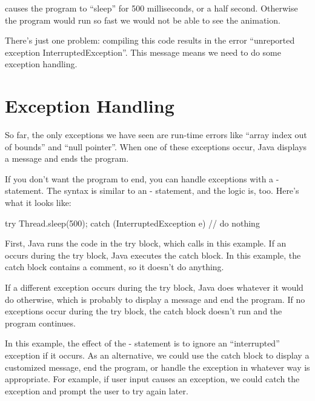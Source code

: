 
 causes the program to ``sleep'' for 500 milliseconds, or a half second.
Otherwise the program would run so fast we would not be able to see the animation.


There's just one problem: compiling this code results in the error ``unreported exception InterruptedException''.
This message means we need to do some exception handling.


\section{Exception Handling}

So far, the only exceptions we have seen are run-time errors like ``array index out of bounds'' and ``null pointer''.
When one of these exceptions occur, Java displays a message and ends the program.

If you don't want the program to end, you can handle exceptions with a - statement.
The syntax is similar to an - statement, and the logic is, too.
Here's what it looks like:


\begin{code}
try {
    Thread.sleep(500);
} catch (InterruptedException e) {
    // do nothing
}
\end{code}

First, Java runs the code in the try block, which calls  in this example.
If an  occurs during the try block, Java executes the catch block.
In this example, the catch block contains a comment, so it doesn't do anything.

If a different exception occurs during the try block, Java does whatever it would do otherwise, which is probably to display a message and end the program.
If no exceptions occur during the try block, the catch block doesn't run and the program continues.

In this example, the effect of the - statement is to ignore an ``interrupted'' exception if it occurs.
As an alternative, we could use the catch block to display a customized message, end the program, or handle the exception in whatever way is appropriate.
For example, if user input causes an exception, we could catch the exception and prompt the user to try again later.

